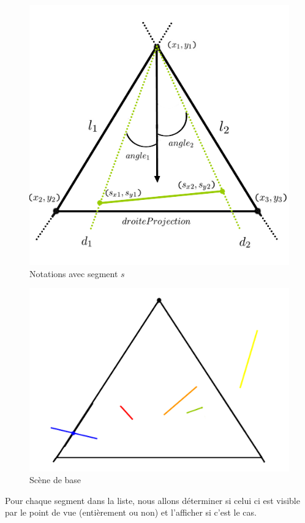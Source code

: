 \documentclass[11pt,a4paper]{article}
\begin{document}
\begin{figure}[!h]
\centering
\includegraphics[scale=0.4]{painter_notations_2.png}
\caption{Notations avec segment $s$}
\label{exp_1}
\end{figure}
\newline
\begin{figure}[!h]
\centering
\includegraphics[scale=0.4]{base.png}
\caption{Scène de base}
\label{exp_2}
\end{figure}

Pour chaque segment dans la liste, nous allons déterminer si celui ci est visible par le point de vue (entièrement ou non) et l'afficher si c'est le cas.
\end{document}

